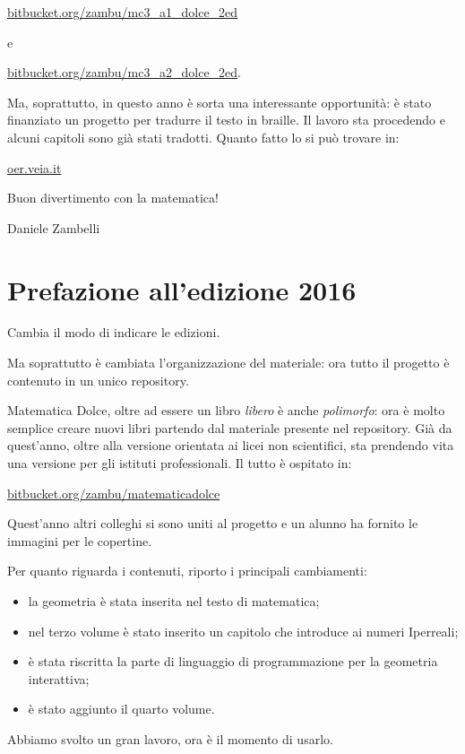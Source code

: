 \url{bitbucket.org/zambu/mc3_a1_dolce_2ed}

e

\url{bitbucket.org/zambu/mc3_a2_dolce_2ed}.


Ma, soprattutto, in questo anno è sorta una interessante opportunità:
è stato finanziato un progetto per tradurre il testo in braille.
Il lavoro sta procedendo e alcuni capitoli sono già stati tradotti.
Quanto fatto lo si può trovare in:

\url{oer.veia.it}

Buon divertimento con la matematica!

\begin{flushright}
Daniele Zambelli
\end{flushright}

\section{Prefazione all'edizione 2016}

Cambia il modo di indicare le edizioni.

Ma soprattutto è cambiata l'organizzazione del materiale: ora tutto il
progetto è contenuto in un unico repository.

Matematica Dolce, oltre ad essere un libro \emph{libero} è anche
\emph{polimorfo}: ora è molto semplice creare nuovi libri partendo dal
materiale presente nel repository. Già da quest'anno, oltre alla versione
orientata ai licei non scientifici, sta prendendo vita una versione per gli
istituti professionali.
Il tutto è ospitato in:

\url{bitbucket.org/zambu/matematicadolce}

Quest'anno altri colleghi si sono uniti al progetto e un alunno ha fornito le
immagini per le copertine.

Per quanto riguarda i contenuti, riporto i principali cambiamenti:
\begin{itemize} [nosep]
 \item la geometria è stata inserita nel testo di matematica;
 \item nel terzo volume è stato inserito un capitolo che introduce ai numeri
Iperreali;
 \item è stata riscritta la parte di linguaggio di programmazione per la
geometria interattiva;
 \item è stato aggiunto il quarto volume.
\end{itemize}

Abbiamo svolto un gran lavoro, ora è il momento di usarlo.

